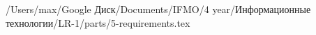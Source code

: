 /Users/max/Google Диск/Documents/IFMO/4 year/Информационные технологии/LR-1/parts/5-requirements.tex